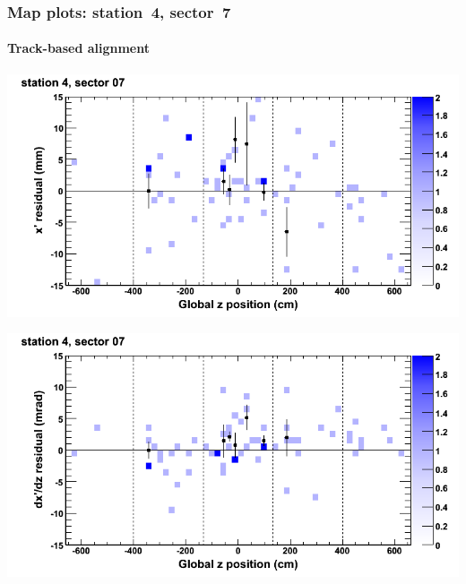 \documentclass[compress]{beamer}
\begin{document}
\begin{frame}
\frametitle{Map plots: station~4, sector~7}
\framesubtitle{Track-based alignment}
\includegraphics[width=0.5\linewidth]{mapplots_re05/DTvsz_st4sec07_x.png}

\includegraphics[width=0.5\linewidth]{mapplots_re05/DTvsz_st4sec07_dxdz.png}
\end{frame}
\end{document}
